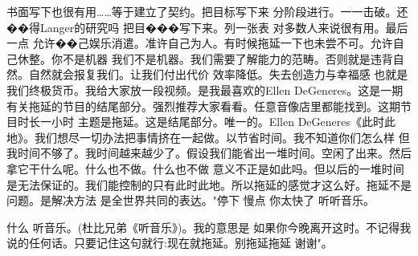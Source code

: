 书面写下也很有用……等于建立了契约。把目标写下来 分阶段进行。一一击破。还��得Langer的研究吗 把目���写下来。列一张表 对多数人来说很有用。最后一点 允许��己娱乐消遣。准许自己为人。有时候拖延一下也未尝不可。允许自己休整。你不是机器 我们不是机器。我们需要了解能力的范畴。否则就是违背自然。自然就会报复我们。让我们付出代价 效率降低。失去创造力与幸福感 也就是我们终极货币。我给大家放一段视频。是我最喜欢的Ellen DeGeneres。这是一期有关拖延的节目的结尾部分。强烈推荐大家看看。任意音像店里都能找到。这期节目时长一小时 主题是拖延。这是结尾部分。唯一的。Ellen DeGeneres《此时此地》。我们想尽一切办法把事情挤在一起做。以节省时间。我不知道你们怎么样 但我时间不够了。我时间越来越少了。假设我们能省出一堆时间。空闲了出来。然后拿它干什么呢。什么也不做。什么也不做 意义不正是如此吗。但以后的一堆时间是无法保证的。我们能控制的只有此时此地。所以拖延的感觉才这么好。拖延不是问题。是解决方法 是全世界共同的表达。"停下 慢点 你太快了 听听音乐。 

什么 听音乐。(杜比兄弟《听音乐》)。我的意思是 如果你今晚离开这时。不记得我说的任何话。只要记住这句就行:现在就拖延。别拖延拖延 谢谢"。 


